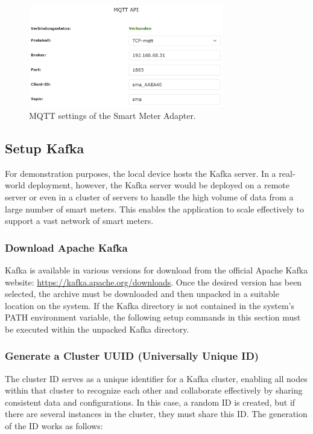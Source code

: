 \begin{figure}[ht]
    \centering
    \includegraphics[width=8.5cm]{images/sma.png}
    \caption{MQTT settings of the Smart Meter Adapter.}
    \label{fig:sma}
\end{figure}

\subsection{Setup Kafka}

For demonstration purposes, the local device hosts the Kafka server. In a real-world deployment, however, the Kafka server would be deployed on a remote server or even in a cluster of servers to handle the high volume of data from a large number of smart meters. This enables the application to scale effectively to support a vast network of smart meters.

\subsubsection{Download Apache Kafka} Kafka is available in various versions for download from the official Apache Kafka website: \url{https://kafka.apache.org/downloads}. Once the desired version has been selected, the archive must be downloaded and then unpacked in a suitable location on the system. If the Kafka directory is not contained in the system's PATH environment variable, the following setup commands in this section must be executed within the unpacked Kafka directory.

\subsubsection{Generate a Cluster UUID (Universally Unique ID)} The cluster ID serves as a unique identifier for a Kafka cluster, enabling all nodes within that cluster to recognize each other and collaborate effectively by sharing consistent data and configurations. In this case, a random ID is created, but if there are several instances in the cluster, they must share this ID. The generation of the ID works as follows:

